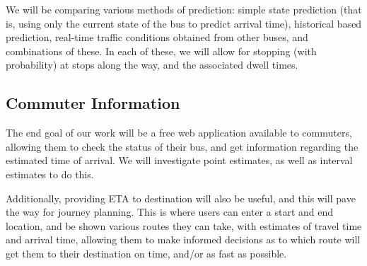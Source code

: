 \documentclass[12pt,a4paper]{article}
\begin{document}
We will be comparing various methods of prediction:
simple state prediction (that is, using only the current state of the 
bus to predict arrival time),
historical based prediction,
real-time traffic conditions obtained from other buses,
and combinations of these.
In each of these, we will allow for stopping (with probability) at stops
along the way, and the associated dwell times.




\subsection{Commuter Information}
\label{sec:commuter-info}


The end goal of our work will be a free web application available to
commuters, allowing them to check the status of their bus,
and get information regarding the estimated time of arrival.
We will investigate point estimates, as well as interval estimates to do this.


Additionally, providing ETA to destination will also be useful,
and this will pave the way for journey planning.
This is where users can enter a start and end location,
and be shown various routes they can take,
with estimates of travel time and arrival time,
allowing them to make informed decisions as to which route will get them
to their destination on time, and/or as fast as possible.









\end{document}
